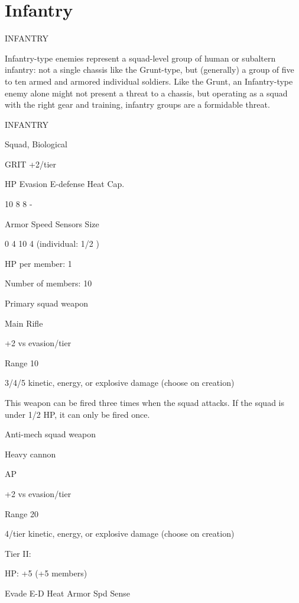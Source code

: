 \section{Infantry}
                                               INFANTRY   

Infantry-type enemies represent a squad-level group of human or subaltern infantry: not a single  
chassis like the Grunt-type, but (generally) a group of five to ten armed and armored individual  
soldiers. Like the Grunt, an Infantry-type enemy alone might not present a threat to a chassis, but  
operating as a squad with the right gear and training, infantry groups are a formidable threat.    

       INFANTRY 

       Squad, Biological 

       GRIT +2/tier 

       HP         Evasion      E-defense     Heat Cap. 

       10         8            8             - 

       Armor      Speed       Sensors        Size 

       0          4            10            4 (individual:  
                                             1/2 ) 

HP per member: 1
 
Number of members: 10
 

Primary squad weapon
 
Main Rifle
 
+2 vs evasion/tier
 
Range 10
 
3/4/5 kinetic, energy, or explosive damage (choose on creation)
 
This weapon can be fired three times when the squad attacks. If the squad is under 1/2 HP, it can  
only be fired once.
 

Anti-mech squad weapon
 
Heavy cannon
 
AP
 
+2 vs evasion/tier
 
Range 20
 
4/tier kinetic, energy, or explosive damage (choose on creation)
 

Tier II:
 
HP: +5 (+5 members)
 

       Evade    E-D    Heat    Armor       Spd      Sense 

                                                                                                           


